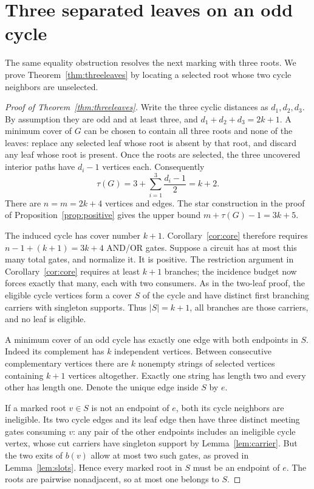 \section{Three separated leaves on an odd cycle}\label{sec:threeleaves}

The same equality obstruction resolves the next marking with three roots.
We prove Theorem~\ref{thm:threeleaves} by locating a selected root whose two
cycle neighbors are unselected.

\begin{proof}[Proof of Theorem~\ref{thm:threeleaves}]
Write the three cyclic distances as $d_1,d_2,d_3$. By assumption they are
odd and at least three, and $d_1+d_2+d_3=2k+1$. A minimum cover of $G$
can be chosen to contain all three roots and none of the leaves: replace
any selected leaf whose root is absent by that root, and discard any leaf
whose root is present. Once the roots are selected, the three uncovered
interior paths have $d_i-1$ vertices each. Consequently
\[
 \tau(G)=3+\sum_{i=1}^{3}\frac{d_i-1}{2}=k+2.
\]
There are $n=m=2k+4$ vertices and edges. The star construction in the proof of
Proposition~\ref{prop:positive} gives the upper bound
$m+\tau(G)-1=3k+5$.

The induced cycle has cover number $k+1$. Corollary~\ref{cor:core} therefore
requires $n-1+(k+1)=3k+4$ AND/OR gates. Suppose a circuit has at most this
many total gates, and normalize it. It is positive. The restriction
argument in Corollary~\ref{cor:core} requires at least $k+1$ branches;
the incidence budget now forces exactly that many, each with two consumers. As in the two-leaf proof,
the eligible cycle vertices form a cover $S$ of the cycle and have distinct
first branching carriers with singleton supports. Thus $|S|=k+1$, all
branches are those carriers, and no leaf is eligible.

A minimum cover of an odd cycle has exactly one edge with both endpoints
in $S$. Indeed its complement has $k$ independent vertices. Between
consecutive complementary vertices there are $k$ nonempty strings of
selected vertices containing $k+1$ vertices altogether. Exactly one string
has length two and every other has length one. Denote the unique edge
inside $S$ by $e$.

If a marked root $v\in S$ is not an endpoint of $e$, both its cycle
neighbors are ineligible. Its two cycle edges and its leaf edge then have
three distinct meeting gates consuming $v$: any pair of the other endpoints
includes an ineligible cycle vertex, whose cut carriers have singleton
support by Lemma~\ref{lem:carrier}. But the two exits of $b(v)$ allow at
most two such gates, as proved in Lemma~\ref{lem:slots}. Hence every marked
root in $S$ must be an endpoint of $e$. The roots are pairwise nonadjacent,
so at most one belongs to $S$.


\end{proof}
